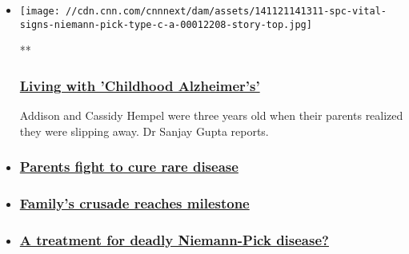 \begin{itemize}
\item
  \href{/videos/international/2014/11/21/spc-vital-signs-niemann-pick-type-c-a.cnn}{}

  \texttt{[image: //cdn.cnn.com/cnnnext/dam/assets/141121141311-spc-vital-signs-niemann-pick-type-c-a-00012208-story-top.jpg]}

  **

  \hypertarget{living-with-childhood-alzheimers}{%
  \subsubsection{\texorpdfstring{\href{/videos/international/2014/11/21/spc-vital-signs-niemann-pick-type-c-a.cnn}{Living
  with 'Childhood
  Alzheimer's'}}{Living with 'Childhood Alzheimer's'}}\label{living-with-childhood-alzheimers}}

  Addison and Cassidy Hempel were three years old when their parents
  realized they were slipping away. Dr Sanjay Gupta reports.
\item
  \hypertarget{parents-fight-to-cure-rare-disease}{%
  \subsubsection{\texorpdfstring{\href{/videos/international/2014/11/21/spc-vital-signs-niemann-pick-type-c-b.cnn}{Parents
  fight to cure rare
  disease}}{Parents fight to cure rare disease}}\label{parents-fight-to-cure-rare-disease}}
\item
  \hypertarget{familys-crusade-reaches-milestone}{%
  \subsubsection{\texorpdfstring{\href{/videos/international/2014/11/21/spc-vital-signs-niemann-pick-type-c-c.cnn}{Family's
  crusade reaches
  milestone}}{Family's crusade reaches milestone}}\label{familys-crusade-reaches-milestone}}
\item
  \hypertarget{a-treatment-for-deadly-niemann-pick-disease}{%
  \subsubsection{\texorpdfstring{\href{/2014/11/21/health/hempels-genetic-disorder-niemann-pick/index.html}{A
  treatment for deadly Niemann-Pick
  disease?}}{A treatment for deadly Niemann-Pick disease?}}\label{a-treatment-for-deadly-niemann-pick-disease}}
\end{itemize}


